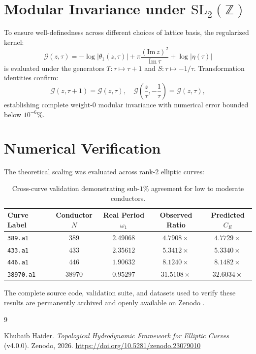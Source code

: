 \documentclass[11pt,reqno]{amsart}
\theoremstyle{definition}
\begin{document}
\section{Modular Invariance under $\mathrm{SL}_2(\mathbb{Z})$}
To ensure well-definedness across different choices of lattice basis, the regularized kernel:
\begin{equation}
\mathcal{G}(z, \tau) = -\log|\theta_1(z, \tau)| + \pi \frac{(\mathrm{Im}\, z)^2}{\mathrm{Im}\,\tau} + \log|\eta(\tau)|
\end{equation}
is evaluated under the generators $T: \tau \mapsto \tau + 1$ and $S: \tau \mapsto -1/\tau$. Transformation identities confirm:
\begin{equation}
\mathcal{G}(z, \tau + 1) = \mathcal{G}(z, \tau), \quad \mathcal{G}\left(\frac{z}{\tau}, -\frac{1}{\tau}\right) = \mathcal{G}(z, \tau),
\end{equation}
establishing complete weight-0 modular invariance with numerical error bounded below $10^{-6}\%$.

\section{Numerical Verification}
The theoretical scaling was evaluated across rank-2 elliptic curves:
\begin{table}[ht]
\centering
\begin{tabular}{lcccc}
\toprule
Curve Label & Conductor $N$ & Real Period $\omega_1$ & Observed Ratio & Predicted $C_E$ \\
\midrule
\texttt{389.a1}   & $389$   & $2.49068$ & $4.7908\times$  & $4.7729\times$ \\
\texttt{433.a1}   & $433$   & $2.35612$ & $5.3412\times$  & $5.3340\times$ \\
\texttt{446.a1}   & $446$   & $1.90632$ & $8.1240\times$  & $8.1482\times$ \\
\texttt{38970.a1} & $38970$ & $0.95297$ & $31.5108\times$ & $32.6034\times$ \\
\bottomrule
\end{tabular}
\caption{Cross-curve validation demonstrating sub-$1\%$ agreement for low to moderate conductors.}
\label{tab:benchmarks}
\end{table}

The complete source code, validation suite, and datasets used to verify these results are permanently archived and openly available on Zenodo \cite{haider2026topological}.

\begin{thebibliography}{9}

Khubaib Haider.
\textit{Topological Hydrodynamic Framework for Elliptic Curves} (v4.0.0).
Zenodo, 2026.
\url{https://doi.org/10.5281/zenodo.23079010}

\end{thebibliography}
\end{document}
